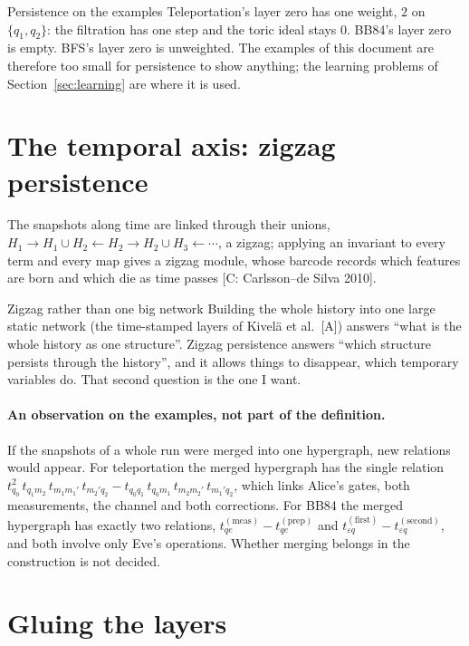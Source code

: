 \documentclass[11pt,a4paper]{article}
\newcommand{\gr}[1]{\textsf{[#1]}}
\begin{document}
\begin{ex}{Persistence on the examples}
Teleportation's layer zero has one weight, $2$ on $\{q_1,q_2\}$: the filtration has one step and the toric ideal stays $0$. BB84's layer zero is empty. BFS's layer zero is unweighted. The examples of this document are therefore too small for persistence to show anything; the learning problems of Section~\ref{sec:learning} are where it is used.
\end{ex}

\section{The temporal axis: zigzag persistence}\label{sec:time}

The snapshots along time are linked through their unions, $H_1\to H_1\cup H_2\leftarrow H_2\to H_2\cup H_3\leftarrow\cdots$, a zigzag; applying an invariant to every term and every map gives a zigzag module, whose barcode records which features are born and which die as time passes \gr{C: Carlsson--de Silva 2010}.

\begin{why}{Zigzag rather than one big network}
Building the whole history into one large static network (the time-stamped layers of Kivelä et al.\ \gr{A}) answers ``what is the whole history as one structure''. Zigzag persistence answers ``which structure persists through the history'', and it allows things to disappear, which temporary variables do. That second question is the one I want.
\end{why}

\paragraph{An observation on the examples, not part of the definition.} If the snapshots of a whole run were merged into one hypergraph, new relations would appear. For teleportation the merged hypergraph has the single relation $t_{q_0}^2\,t_{q_1m_2}\,t_{m_1m_1'}\,t_{m_2'q_2}-t_{q_0q_1}\,t_{q_0m_1}\,t_{m_2m_2'}\,t_{m_1'q_2}$, which links Alice's gates, both measurements, the channel and both corrections. For BB84 the merged hypergraph has exactly two relations, $t^{(\mathrm{meas})}_{qe}-t^{(\mathrm{prep})}_{qe}$ and $t^{(\text{first})}_{\varepsilon q}-t^{(\text{second})}_{\varepsilon q}$, and both involve only Eve's operations. Whether merging belongs in the construction is not decided.

\section{Gluing the layers}\label{sec:glue}
\end{document}
